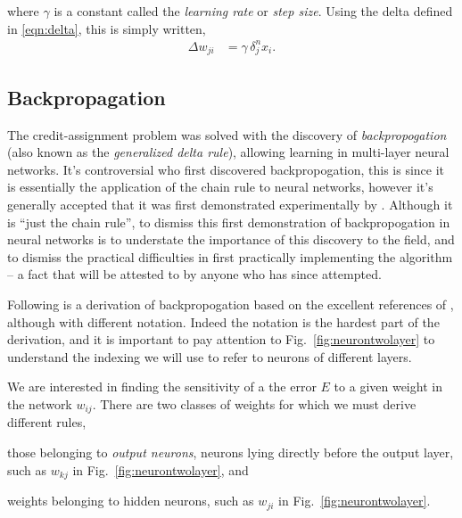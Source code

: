 \documentclass[thesis]{subfiles}
\begin{document}
where $\gamma$ is a constant called the \emph{learning rate} or \emph{step size}. Using the delta defined in \ref{eqn:delta}, this is simply written,
\begin{equation}
\begin{aligned}
    \Delta w_{ji} &= \gamma\, \delta^n_j x_i.
\end{aligned}
\end{equation}


\subsection{Backpropagation}
The credit-assignment problem was solved with the discovery of \emph{backpropogation} (also known as the \emph{generalized delta rule}), allowing learning in multi-layer neural networks. It's controversial who first discovered backpropogation, this is since it is essentially the application of the chain rule to neural networks, however it's generally accepted that it was first demonstrated experimentally by \citet{rumelhartbackprop}. Although it is ``just the chain rule'', to dismiss this first demonstration of backpropogation in neural networks is to understate the importance of this discovery to the field, and to dismiss the practical difficulties in first practically implementing the algorithm -- a fact that will be attested to by anyone who has since attempted.

Following is a derivation of backpropogation based on the excellent references of \citet{haykin1994neural,Bishop1995}, although with different notation. Indeed the notation is the hardest part of the derivation, and it is important to pay attention to Fig.~\ref{fig:neurontwolayer} to understand the indexing we will use to refer to neurons of different layers.

We are interested in finding the sensitivity of a the error $E$ to a given weight in the network $w_{ij}$. There are two classes of weights for which we must derive different rules, 
\begin{enumerate*}[label=(\textbf{\roman*})]
  \item \label{enum:outputneuron} those belonging to \emph{output neurons}, \ie neurons lying directly before the output layer, such as $w_{kj}$ in Fig.~\ref{fig:neurontwolayer}, and
  \item \label{enum:hiddenneuron} weights belonging to hidden neurons, such as $w_{ji}$ in Fig.~\ref{fig:neurontwolayer}.
\end{enumerate*}
\end{document}
